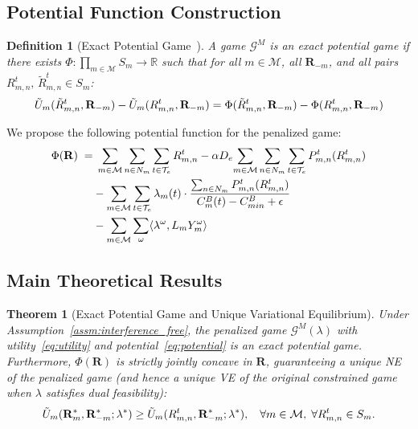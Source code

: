 \documentclass[journal]{IEEEtran}
\newtheorem{theorem}{Theorem}
\newtheorem{definition}{Definition}
\newcommand{\CB}{C^{B}}
\newcommand{\CBmin}{C^{B}_{min}}
\newcommand{\calM}{\mathcal{M}}
\newcommand{\calG}{\mathcal{G}}
\newcommand{\calT}{\mathcal{T}}
\newcommand{\bfR}{\mathbf{R}}
\newcommand{\Rmn}{R_{m,n}^{t}}
\begin{document}
\subsection{Potential Function Construction}

\begin{definition}[Exact Potential Game~\cite{monderer1996potential}]
A game $\calG^M$ is an \emph{exact potential game} if there exists $\Phi:\prod_{m\in\calM} S_m\to\mathbb{R}$ such that for all $m\in\calM$, all $\bfR_{-m}$, and all pairs $R_{m,n}^t,\,\tilde{R}_{m,n}^t\in S_m$:
\begin{equation}
    \small
    \tilde{U}_m(\tilde{R}_{m,n}^t,\bfR_{-m})
    - \tilde{U}_m(R_{m,n}^t,\bfR_{-m})
    = \Phi(\tilde{R}_{m,n}^t,\bfR_{-m})
    - \Phi(R_{m,n}^t,\bfR_{-m})
    \label{eq:epg_def}
\end{equation}
\end{definition}

We propose the following potential function for the penalized game:
\begin{align}
    \small
    \Phi(\bfR) \;=&\;
    \sum_{m\in\calM}\sum_{n\in N_m}
    \sum_{t\in\calT_e} \Rmn
    - \alpha D_e\!
    \sum_{m\in\calM}\sum_{n\in N_m}
    \sum_{t\in\calT_e} P_{m,n}^t(\Rmn)
    \notag\\
    &- \sum_{m\in\calM}\sum_{t\in\calT_e}
    \lambda_m(t)\cdot
    \frac{\sum_{n\in N_m}P_{m,n}^t(\Rmn)}%
    {\CB_m(t)-\CBmin+\epsilon}
    \notag\\
    &- \sum_{m\in\calM}\sum_\omega
    \langle \lambda^\omega, L_m Y_m^\omega \rangle
    \label{eq:potential}
\end{align}

\subsection{Main Theoretical Results}

\begin{theorem}[Exact Potential Game and Unique
Variational Equilibrium]
\label{thm:potential}
Under Assumption~\ref{assm:interference_free}, the penalized game $\calG^M(\lambda)$ with utility~\eqref{eq:utility} and potential~\eqref{eq:potential} is an
\emph{exact potential game}.
Furthermore, $\Phi(\bfR)$ is strictly jointly concave in $\bfR$, guaranteeing a \emph{unique} NE of the penalized game (and hence a unique VE of the original constrained game when $\lambda$ satisfies dual feasibility):
\begin{equation}
    \small
    \tilde{U}_m(\bfR_{m}^*,\bfR_{-m}^*;\lambda^*)
    \geq \tilde{U}_m(R_{m,n}^t,\bfR_{-m}^*;\lambda^*),
    \quad\forall m\in\calM,\;
    \forall R_{m,n}^t\in S_m.
\end{equation}
\end{theorem}
\end{document}
